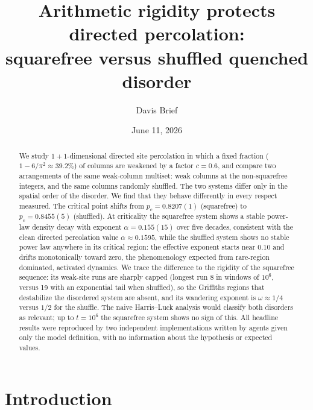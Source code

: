 \documentclass[aps,pre,twocolumn,superscriptaddress,nofootinbib]{revtex4-2}
\begin{document}
\title{Arithmetic rigidity protects directed percolation:\\ squarefree versus shuffled quenched disorder}

\author{Davis Brief}

\date{June 11, 2026}

\begin{abstract}
We study $1{+}1$-dimensional directed site percolation in which a fixed fraction
($1-6/\pi^2 \approx 39.2\%$) of columns are weakened by a factor $c=0.6$, and compare two
arrangements of the same weak-column multiset: weak columns at the non-squarefree integers,
and the same columns randomly shuffled. The two systems differ only in the spatial order of
the disorder. We find that they behave differently in every respect measured. The critical
point shifts from $p_c=0.8207(1)$ (squarefree) to $p_c=0.8455(5)$ (shuffled). At criticality
the squarefree system shows a stable power-law density decay with exponent
$\alpha=0.155(15)$ over five decades, consistent with the clean directed percolation value
$\alpha \approx 0.1595$, while the shuffled system shows no stable power law anywhere in its
critical region: the effective exponent starts near $0.10$ and drifts monotonically toward
zero, the phenomenology expected from rare-region dominated, activated dynamics. We trace
the difference to the rigidity of the squarefree sequence: its weak-site runs are sharply
capped (longest run 8 in windows of $10^6$, versus 19 with an exponential tail when
shuffled), so the Griffiths regions that destabilize the disordered system are absent, and
its wandering exponent is $\omega \approx 1/4$ versus $1/2$ for the shuffle. The naive
Harris--Luck analysis would classify both disorders as relevant; up to $t=10^6$ the
squarefree system shows no sign of this. All headline results were reproduced by two
independent implementations written by agents given only the model definition, with no
information about the hypothesis or expected values.
\end{abstract}

\maketitle

\section{Introduction}
\end{document}
